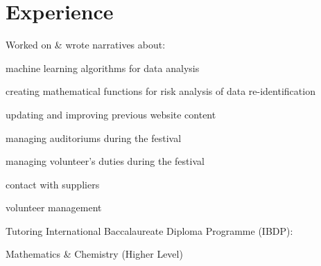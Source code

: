 \documentclass[letterpaper]{deedy-resume} %
\begin{document}
\begin{minipage}[t]{0.66\textwidth}

\section{Experience}


Worked on \& wrote narratives about:
\sectionspace
\begin{tightitemize}
\item machine learning algorithms for data analysis
\item creating mathematical functions for risk analysis of data re-identification
\end{tightitemize}

\sectionspace %




\begin{tightitemize}
\item updating and improving previous website content
\item managing auditoriums during the festival
\item managing volunteer's duties during the festival
\end{tightitemize}
\sectionspace %

\begin{tightitemize}
\item contact with suppliers
\item volunteer management
\end{tightitemize}
\sectionspace


Tutoring International Baccalaureate Diploma Programme (IBDP):
\begin{tightitemize}
\item Mathematics \& Chemistry (Higher Level)
\end{tightitemize}



\end{minipage} %
\end{document}
